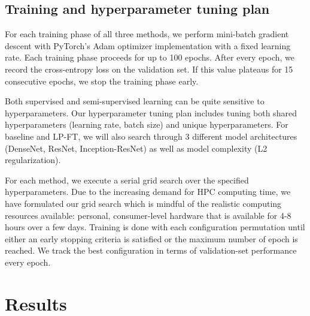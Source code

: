 \documentclass{article}
\begin{document}
\subsection{Training and hyperparameter tuning plan}

For each training phase of all three methods, we perform mini-batch gradient descent with PyTorch's Adam optimizer implementation \cite{paszke2019pytorch} with a fixed learning rate. Each training phase proceeds for up to 100 epochs. After every epoch, we record the cross-entropy loss on the validation set. If this value plateaus for 15 consecutive epochs, we stop the training phase early.

Both supervised and semi-supervised learning can be quite sensitive to hyperparameters. Our hyperparameter tuning plan includes tuning both shared hyperparameters (learning rate, batch size) and unique hyperparameters. For baseline and LP-FT, we will also search through 3 different model architectures (DenseNet, ResNet, Inception-ResNet) as well as model complexity (L2 regularization).

For each method, we execute a serial grid search over the specified hyperparameters. Due to the increasing demand for HPC computing time, we have formulated our grid search which is mindful of the realistic computing resources available: personal, consumer-level hardware that is available for 4-8 hours over a few days. Training is done with each configuration permutation until either an early stopping criteria is satisfied or the maximum number of epoch is reached. We track the best configuration in terms of validation-set performance every epoch.


\section{Results}
\end{document}
